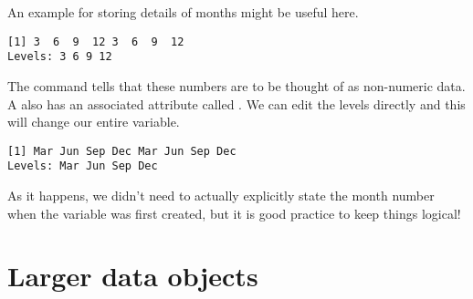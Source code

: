 An example for storing details of months might be useful here. 
\begin{knitrout}
\color{fgcolor}\begin{kframe}
\begin{alltt}
\hlstd{> } \hlkwb{=} \hlstd{(}\hlstd{(}\hlstd{,}\hlstd{,}\hlstd{,}\hlstd{,}\hlstd{,}\hlstd{,}\hlstd{,}\hlstd{))}
\hlstd{> }
\end{alltt}
\begin{verbatim}
[1] 3  6  9  12 3  6  9  12
Levels: 3 6 9 12
\end{verbatim}
\end{kframe}
\end{knitrout}
The  command tells \R{} that these numbers are to be thought of as non-numeric data. A  also has an associated attribute called . We can edit the levels directly and this will change our entire variable. \label{UseOfLevels} 
\begin{knitrout}
\color{fgcolor}\begin{kframe}
\begin{alltt}
\hlstd{> } \hlkwb{=} \hlstd{(}\hlstd{,} \hlstd{,} \hlstd{,} \hlstd{)}
\hlstd{> }
\end{alltt}
\begin{verbatim}
[1] Mar Jun Sep Dec Mar Jun Sep Dec
Levels: Mar Jun Sep Dec
\end{verbatim}
\end{kframe}
\end{knitrout}
As it happens, we didn't need to actually explicitly state the month number when the variable was first created, but it is good practice to keep things logical! 
 
\section{Larger data objects} 
 
